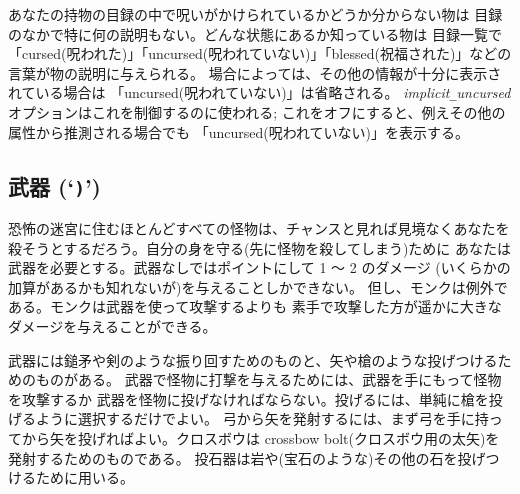 あなたの持物の目録の中で呪いがかけられているかどうか分からない物は
目録のなかで特に何の説明もない。どんな状態にあるか知っている物は
目録一覧で「cursed(呪われた)」「uncursed(呪われていない)」「blessed(祝福された)」などの
言葉が物の説明に与えられる。
場合によっては、その他の情報が十分に表示されている場合は
「uncursed(呪われていない)」は省略される。
{\it implicit\verb+_+uncursed\/}
オプションはこれを制御するのに使われる;
これをオフにすると、例えその他の属性から推測される場合でも
「uncursed(呪われていない)」を表示する。

\subsection*{武器 (`{\tt )}')}

恐怖の迷宮に住むほとんどすべての怪物は、チャンスと見れば見境なくあなたを
殺そうとするだろう。自分の身を守る(先に怪物を殺してしまう)ために
あなたは武器を必要とする。武器なしではポイントにして 1 ～ 2 のダメージ
(いくらかの加算があるかも知れないが)を与えることしかできない。
但し、モンクは例外である。モンクは武器を使って攻撃するよりも
素手で攻撃した方が遥かに大きなダメージを与えることができる。

武器には鎚矛や剣のような振り回すためのものと、矢や槍のような投げつけるためのものがある。
武器で怪物に打撃を与えるためには、武器を手にもって怪物を攻撃するか
武器を怪物に投げなければならない。投げるには、単純に槍を投げるように選択するだけでよい。
弓から矢を発射するには、まず弓を手に持ってから矢を投げればよい。クロスボウは
crossbow bolt(クロスボウ用の太矢)を発射するためのものである。
投石器は岩や(宝石のような)その他の石を投げつけるために用いる。

